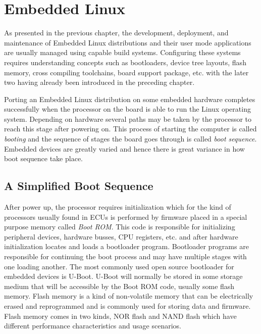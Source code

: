 
\section{Embedded Linux}

As presented in the previous chapter, the development, deployment, and maintenance of Embedded Linux distributions and their user mode applications are usually managed using capable build systems. Configuring these systems requires understanding concepts such as bootloaders, device tree layouts, flash memory, cross compiling toolchains, board support package, etc. with the later two having already been introduced in the preceding chapter.

Porting an Embedded Linux distribution on some embedded hardware completes successfully when the processor on the board is able to run the Linux operating system. Depending on hardware several paths may be taken by the processor to reach this stage after powering on. This process of starting the computer is called \textit{booting} and the sequence of stages the board goes through is called \textit{boot sequence}. Embedded devices are greatly varied and hence there is great variance in how boot sequence take place.

\subsection{A Simplified Boot Sequence}

After power up, the processor requires initialization which for the kind of processors usually found in ECUs is performed by firmware placed in a special purpose memory called \textit{Boot ROM}. This code is responsible for initializing peripheral devices, hardware busses, CPU registers, etc. and after hardware initialization locates and loads a bootloader program. Bootloader programs are responsible for continuing the boot process and may have multiple stages with one loading another. The most commonly used open source bootloader for embedded devices is U-Boot. U-Boot will normally be stored in some storage medium that will be accessible by the Boot ROM code, usually some flash memory. Flash memory is a kind of non-volatile memory that can be electrically erased and reprogrammed and is commonly used for storing data and firmware. Flash memory comes in two kinds, NOR flash and NAND flash which have different performance characteristics and usage scenarios.

